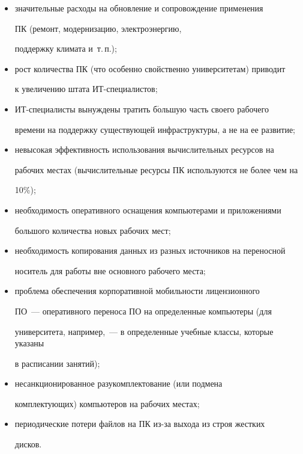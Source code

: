   \begin{itemize}

\item значительные расходы на обновление и сопровождение применения 

ПК (ремонт, модернизацию, электроэнергию, 

поддержку климата и~т.\,п.);

\item рост количества ПК (что особенно свойственно университетам) приводит 

к увеличению штата ИТ-спе\-ци\-а\-листов;

\item ИТ-специалисты вынуждены тратить б$\acute{\mbox{о}}$льшую часть своего рабочего 

времени на поддержку существующей инфраструктуры, а не на ее развитие;

\item невысокая эффективность использования вычислительных ресурсов на 

рабочих местах (вычислительные ресурсы ПК используются не более чем на 

10\%);

\item необходимость оперативного оснащения компьютерами и приложениями 

большого количества новых рабочих мест;

\item необходимость копирования данных из разных источников на переносной 

носитель для работы вне основного рабочего места;

\item проблема обеспечения корпоративной мобильности лицензионного 

ПО~--- оперативного переноса ПО на определенные компьютеры (для 

университета, например,~--- в определенные учебные классы, которые указаны 

в расписании занятий); 

\item несанкционированное разукомплектование (или подмена 

комплектующих) компьютеров на рабочих местах;

\item периодические потери файлов на ПК из-за выхода из строя жестких 

дисков. 

\end{itemize}



